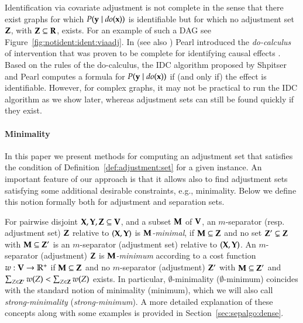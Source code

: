 Identification via covariate adjustment is not complete in the sense
that there exist graphs for which $P({\bf y}\mid \textit{do}({\bf x}))$ is identifiable 
but for which no adjustment set ${\bf Z}$, with ${\bf Z} \subseteq {\bf R}$, exists.
For an example of such a DAG see Figure~\ref{fig:notident:ident:viaadj}.
In \cite{pearl1995causal} (see also \cite[Section~3.4]{Pearl2009}) Pearl introduced 
the \emph{do-calculus} of intervention that was proven to be complete for
identifying causal effects \cite{shpitser2006identification,huang2006pearl}.
Based on the rules of the do-calculus, the IDC algorithm proposed by 
Shpitser and Pearl \cite{ShpitserIDCAlgorithm} computes a formula for 
$P({\bf y} \mid  \textit{do}({\bf x}))$ if (and only if) the effect is identifiable.
 However, for complex graphs, it may not be practical to 
run the IDC algorithm as we show later, whereas adjustment sets can still be found
quickly if they exist. 


\paragraph{Minimality}
In this paper we present methods for computing an adjustment set 
that satisfies the condition of Definition~\ref{def:adjustment:set} for a given instance. An important feature 
of our approach is that it allows also to find adjustment sets satisfying some additional desirable 
constraints, e.g., minimality. Below we define this notion formally both for adjustment
and separation sets.


For pairwise disjoint ${\bf X},{\bf Y},{\bf Z} \subseteq {\bf V}$,
and  a subset ${\bf M}$ of ${\bf V}$,
an $m$-separator (resp. adjustment set) ${\bf Z}$ relative to $({\bf X},{\bf Y})$ 
is \textit{${\bf M}$-minimal}, if ${\bf M}\subseteq {\bf Z}$ and no set ${\bf Z}' \subsetneq {\bf Z}$ 
with ${\bf M} \subseteq {\bf Z}'$ is an $ m $-separator (adjustment set) relative to $({\bf X},{\bf Y})$.
An $ m $-separator (adjustment) ${\bf Z}$ is \textit{$ {\bf M} $-minimum} 
according to a cost function $w: {\bf V}\to \mathbb{R}^+$ if ${\bf M}\subseteq {\bf Z}$ 
and no $ m $-separator (adjustment) ${\bf Z}'$ with ${\bf M} \subseteq {\bf Z}'$ 
and $ \sum_{Z\in{\bf Z}'} w(Z) < \sum_{Z\in{\bf Z}} w(Z) $ exists. 
In particular, $\emptyset$-minimality ($\emptyset$-minimum)
coincides with the standard notion of minimality (minimum), which we will also 
call \emph{strong-minimality} (\emph{strong-minimum}). A more detailed explanation of these concepts along with some examples is provided in Section~\ref{sec:sepalgo:dense}.

